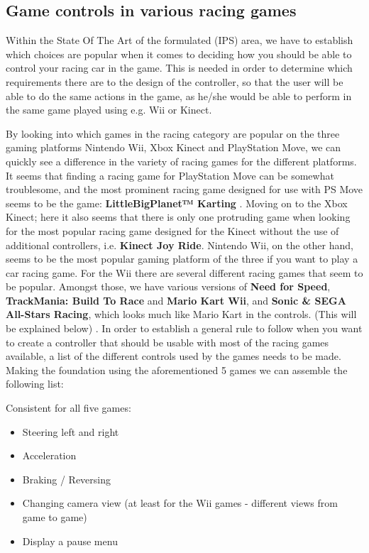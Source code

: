 \subsection{Game controls in various racing games}
\label{gamecontrols}
Within the State Of The Art of the formulated (IPS) area, we have to establish which choices are popular when it comes to deciding how you should be able to control your racing car in the game. This is needed in order to determine which requirements there are to the design of the controller, so that the user will be able to do the same actions in the game, as he/she would be able to perform in the same game played using e.g. Wii or Kinect.

By looking into which games in the racing category are popular on the three gaming platforms Nintendo Wii, Xbox Kinect and PlayStation Move, we can quickly see a difference in the variety of racing games for the different platforms. It seems that finding a racing game for PlayStation Move can be somewhat troublesome, and the most prominent racing game designed for use with PS Move seems to be the game: \textbf{LittleBigPlanet™ Karting} \parencite{Miller2012}. Moving on to the Xbox Kinect; here it also seems that there is only one protruding game  when looking for the most popular racing game designed for the Kinect without the use of additional controllers, i.e. \textbf{Kinect Joy Ride}\parencite{Davidson2010}. Nintendo Wii, on the other hand, seems to be the most popular gaming platform of the three if you want to play a car racing game. For the Wii there are several different racing games that seem to be popular. Amongst those, we have various versions of \textbf{Need for Speed}, \textbf{TrackMania: Build To Race} and \textbf{Mario Kart Wii}, and \textbf{Sonic \& SEGA All-Stars Racing}, which looks much like Mario Kart in the controls. (This will be explained below) \parencite{Ign2013}.
In order to establish a general rule to follow when you want to create a controller that should be usable with most of the racing games available, a list of the different controls used by the games needs to be made. Making the foundation using the aforementioned 5 games we can assemble the following list:
\bigskip

\noindent Consistent for all five games:
\begin{itemize}
\item Steering left and right
\item Acceleration
\item Braking / Reversing
\item Changing camera view (at least for the Wii games - different views from game to game)
\item Display a pause menu
\end{itemize}

